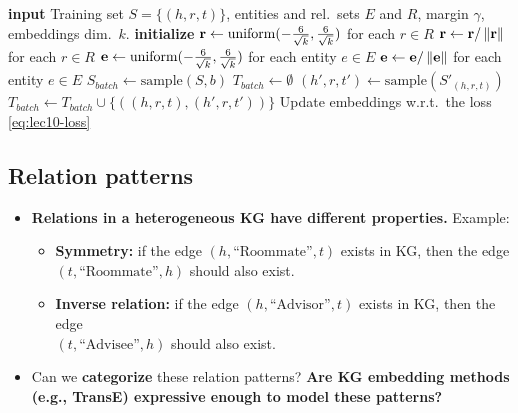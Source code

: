\begin{algorithm}[htbp]
  \caption{Learning TransE (slide~21)}\label{alg:lec10-transe}
  \begin{algorithmic}[1]
    \Statex \textbf{input} Training set $S=\{(h,r,t)\}$, entities and rel.\ sets
      $E$ and $R$, margin $\gamma$, embeddings dim.\ $k$.
    \State \textbf{initialize} $\mathbf{r}\gets\mathrm{uniform}(-\frac{6}{\sqrt{k}},
      \frac{6}{\sqrt{k}})$ for each $r\in R$
    \State {} $\mathbf{r}\gets\mathbf{r}/\left\lVert \mathbf{r} \right\rVert$ for each $r\in R$
    \State {} $\mathbf{e}\gets\mathrm{uniform}(-\frac{6}{\sqrt{k}},
      \frac{6}{\sqrt{k}})$ for each entity $e\in E$
    \Loop
      \State $\mathbf{e}\gets\mathbf{e}/\left\lVert \mathbf{e} \right\rVert$ for each entity $e\in E$
      \State $S_{batch}\gets\mathrm{sample}(S,b)$ 
      \State $T_{batch}\gets\emptyset$ 
        \State $(h',r,t')\gets\mathrm{sample}(S'_{(h,r,t)})$ 
        \State $T_{batch}\gets T_{batch}\cup\{((h,r,t),(h',r,t'))\}$
      \EndFor
      \State Update embeddings w.r.t.\ the loss \eqref{eq:lec10-loss}
    \EndLoop
  \end{algorithmic}
\end{algorithm}

\subsection{Relation patterns}\label{sec:lec10-patterns}

\begin{itemize}
  \item \textbf{Relations in a heterogeneous KG have different properties.}
    Example:
    \begin{itemize}
      \item \textbf{Symmetry:} if the edge $(h,\text{``Roommate''},t)$ exists
        in KG, then the edge\\ $(t,\text{``Roommate''},h)$ should also exist.
      \item \textbf{Inverse relation:} if the edge $(h,\text{``Advisor''},t)$
        exists in KG, then the edge\\ $(t,\text{``Advisee''},h)$ should also
        exist.
    \end{itemize}
  \item Can we \textbf{categorize} these relation patterns? \textbf{Are KG
    embedding methods (e.g., TransE) expressive enough to model these
    patterns?}
\end{itemize}

